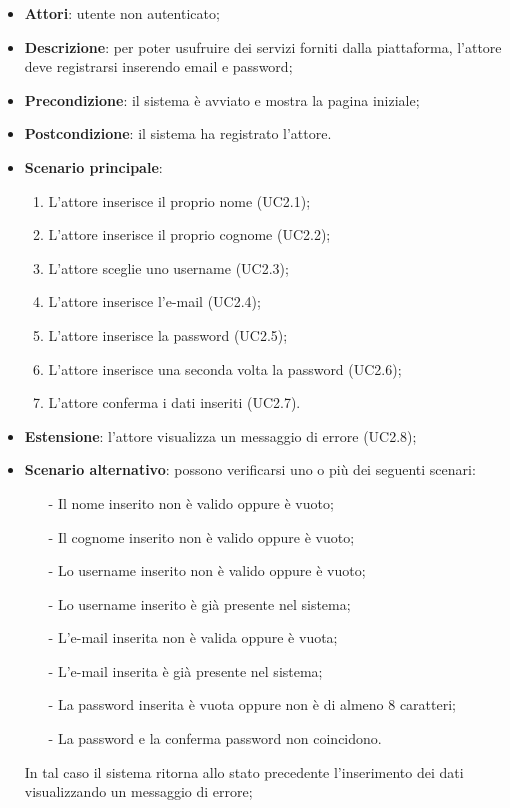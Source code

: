 \begin{itemize}
\item \textbf{Attori}: utente non autenticato;
\item \textbf{Descrizione}: per poter usufruire dei servizi forniti dalla piattaforma, l'attore deve registrarsi inserendo email e password;
\item \textbf{Precondizione}: il sistema è avviato e mostra la pagina iniziale;
\item \textbf{Postcondizione}: il sistema ha registrato l'attore.
\item \textbf{Scenario principale}:
	\begin{enumerate}
	\item L'attore inserisce il proprio nome (UC2.1);
	\item L'attore inserisce il proprio cognome (UC2.2);
	\item L'attore sceglie uno username (UC2.3);
	\item L'attore inserisce l'e-mail (UC2.4);
	\item L'attore inserisce la password (UC2.5);
	\item L'attore inserisce una seconda volta la password (UC2.6);
	\item L'attore conferma i dati inseriti (UC2.7).
	\end{enumerate}
\item \textbf{Estensione}: l'attore visualizza un messaggio di errore (UC2.8);
\item \textbf{Scenario alternativo}: possono verificarsi uno o più dei seguenti scenari:
	\begin{itemize}
	\item[-] Il nome inserito non è valido oppure è vuoto;
	\item[-] Il cognome inserito non è valido oppure è vuoto;
	\item[-] Lo username inserito non è valido oppure è vuoto;
	\item[-] Lo username inserito è già presente nel sistema;
	\item[-] L'e-mail inserita non è valida oppure è vuota;
	\item[-] L'e-mail inserita è già presente nel sistema;
	\item[-] La password inserita è vuota oppure non è di almeno 8 caratteri;
	\item[-] La password e la conferma password non coincidono.
	\end{itemize}
In tal caso il sistema ritorna allo stato precedente l'inserimento dei dati visualizzando un messaggio di errore;
\end{itemize}

